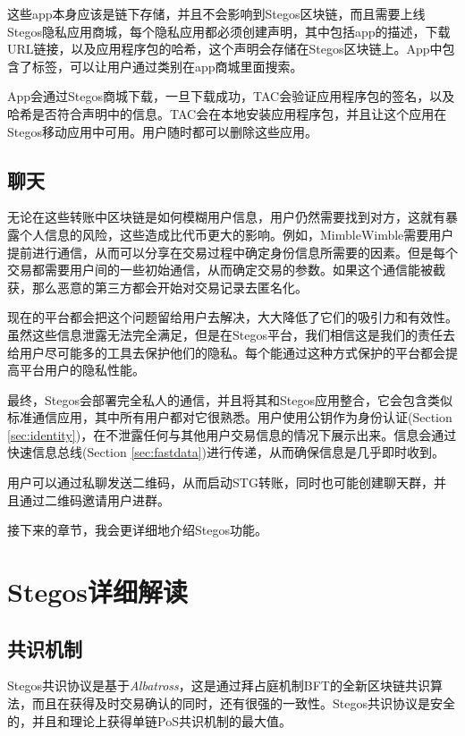 \documentclass[8pt,fleqn,openany]{book}
\begin{document}
\begin{CJK*}{UTF8}{gbsn}
这些app本身应该是链下存储，并且不会影响到Stegos区块链，而且需要上线Stegos隐私应用商城，每个隐私应用都必须创建声明，其中包括app的描述，下载URL链接，以及应用程序包的哈希，这个声明会存储在Stegos区块链上。App中包含了标签，可以让用户通过类别在app商城里面搜索。

App会通过Stegos商城下载，一旦下载成功，TAC会验证应用程序包的签名，以及哈希是否符合声明中的信息。TAC会在本地安装应用程序包，并且让这个应用在Stegos移动应用中可用。用户随时都可以删除这些应用。

\section{聊天}\label{sec:chat}
无论在这些转账中区块链是如何模糊用户信息，用户仍然需要找到对方，这就有暴露个人信息的风险，这些造成比代币更大的影响。例如，MimbleWimble需要用户提前进行通信，从而可以分享在交易过程中确定身份信息所需要的因素。但是每个交易都需要用户间的一些初始通信，从而确定交易的参数。如果这个通信能被截获，那么恶意的第三方都会开始对交易记录去匿名化。

现在的平台都会把这个问题留给用户去解决，大大降低了它们的吸引力和有效性。虽然这些信息泄露无法完全满足，但是在Stegos平台，我们相信这是我们的责任去给用户尽可能多的工具去保护他们的隐私。每个能通过这种方式保护的平台都会提高平台用户的隐私性能。

最终，Stegos会部署完全私人的通信，并且将其和Stegos应用整合，它会包含类似标准通信应用，其中所有用户都对它很熟悉。用户使用公钥作为身份认证(Section \ref{sec:identity})，在不泄露任何与其他用户交易信息的情况下展示出来。信息会通过快速信息总线(Section \ref{sec:fastdata})进行传递，从而确保信息是几乎即时收到。

用户可以通过私聊发送二维码，从而启动STG转账，同时也可能创建聊天群，并且通过二维码邀请用户进群。

接下来的章节，我会更详细地介绍Stegos功能。

\chapter{Stegos详细解读}\label{chap:stegos-in-depth}

\section{共识机制}
Stegos共识协议是基于\textit{Albatross}\cite{c23}，这是通过拜占庭机制BFT\cite{c9}的全新区块链共识算法，而且在获得及时交易确认的同时，还有很强的一致性。Stegos共识协议是安全的，并且和理论上获得单链PoS共识机制的最大值。


\end{CJK*}
\end{document}
